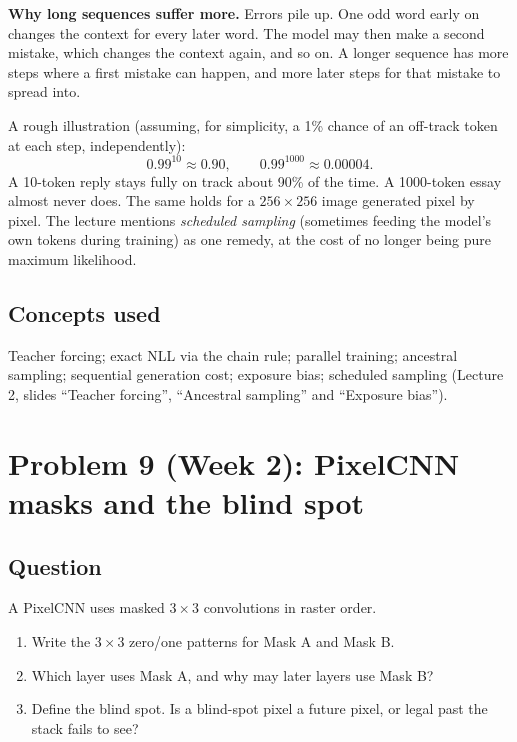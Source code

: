 \documentclass[12pt,a4paper]{article}
\begin{document}
\textbf{Why long sequences suffer more.} Errors pile up. One odd word early on changes the context for every later word. The model may then make a second mistake, which changes the context again, and so on. A longer sequence has more steps where a first mistake can happen, and more later steps for that mistake to spread into.

A rough illustration (assuming, for simplicity, a 1\% chance of an off-track token at each step, independently):
\[
0.99^{10} \approx 0.90, \qquad 0.99^{1000} \approx 0.00004.
\]
A 10-token reply stays fully on track about 90\% of the time. A 1000-token essay almost never does. The same holds for a $256 \times 256$ image generated pixel by pixel. The lecture mentions \emph{scheduled sampling} (sometimes feeding the model's own tokens during training) as one remedy, at the cost of no longer being pure maximum likelihood.

\subsection{Concepts used}

Teacher forcing; exact NLL via the chain rule; parallel training; ancestral sampling; sequential generation cost; exposure bias; scheduled sampling (Lecture 2, slides ``Teacher forcing'', ``Ancestral sampling'' and ``Exposure bias'').

\section{Problem 9 (Week 2): PixelCNN masks and the blind spot}

\subsection{Question}

A PixelCNN uses masked $3 \times 3$ convolutions in raster order.

\begin{enumerate}[leftmargin=*]
\item Write the $3 \times 3$ zero/one patterns for Mask A and Mask B.
\item Which layer uses Mask A, and why may later layers use Mask B?
\item Define the blind spot. Is a blind-spot pixel a future pixel, or legal past the stack fails to see?
\end{enumerate}
\end{document}

